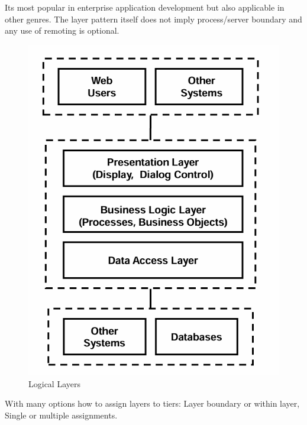 \documentclass[../Main.tex]{subfiles}
\begin{document}
Its most popular in enterprise application development but also applicable in other genres.
The layer pattern itself does not imply process/server boundary and any use of remoting is optional.


\begin{figure}[H]
    \centering
    \includegraphics[width=0.4\linewidth]{Images/logicallayer.png}
    \caption{Logical Layers}
\end{figure}

With many options how to assign layers to tiers: Layer boundary or
within layer,  Single or multiple assignments.

\newpage
\end{document}

